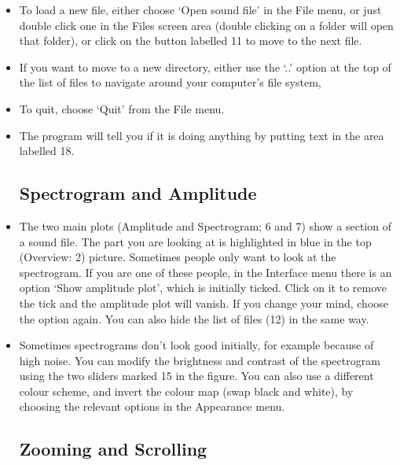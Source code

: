 \documentclass{article}
\begin{document}
\begin{itemize}
\item To load a new file, either choose `Open sound file' in the File menu, or just double click one in the Files screen area (double clicking on a folder will open that folder), or click on the button labelled 11 to move to the next file. 

\item If you want to move to a new directory, either use the `..' option at the top of the list of files to navigate around your computer's file system,  

\item To quit, choose `Quit' from the File menu. 

\item The program will tell you if it is doing anything by putting text in the area labelled 18. 

\subsection{Spectrogram and Amplitude}

\item The two main plots (Amplitude and Spectrogram; 6 and 7) show a section of a sound file. The part you are looking at is highlighted in blue in the top (Overview: 2) picture. Sometimes people only want to look at the spectrogram. If you are one of these people, in the Interface menu there is an option `Show amplitude plot', which is initially ticked. Click on it to remove the tick and the amplitude plot will vanish. If you change your mind, choose the option again. You can also hide the list of files (12) in the same way. 

\item Sometimes spectrograms don't look good initially, for example because of high noise. You can modify the brightness and contrast of the spectrogram using the two sliders marked 15 in the figure. You can also use a different colour scheme, and invert the colour map (swap black and white), by choosing the relevant options in the Appearance menu. 

\subsection{Zooming and Scrolling}


\end{itemize}
\end{document}
